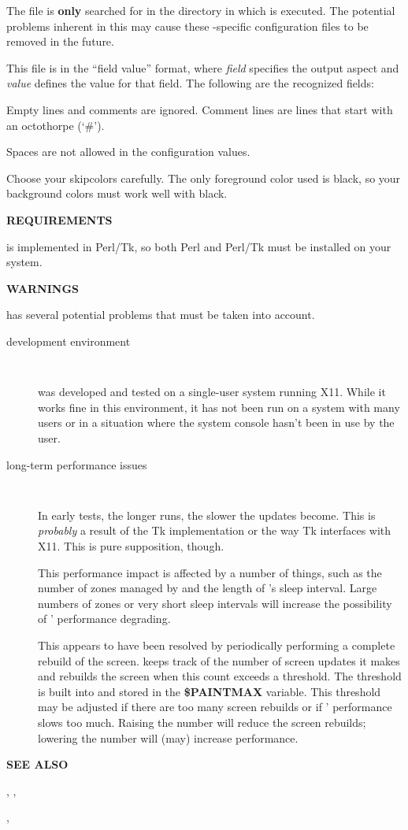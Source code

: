 The  file is {\bf only} searched for in the directory in
which  is executed.  The potential problems inherent in
this may cause these -specific configuration files to be
removed in the future.

This file is in the ``field value'' format, where {\it field} specifies the
output aspect and {\it value} defines the value for that field.  The following
are the recognized fields:

Empty lines and comments are ignored.  Comment lines are lines that start
with an octothorpe (`\#').

Spaces are not allowed in the configuration values.

Choose your skipcolors carefully.  The only foreground color used is black, so
your background colors must work well with black.

{\bf REQUIREMENTS}

 is implemented in Perl/Tk, so both Perl and Perl/Tk must be
installed on your system.

{\bf WARNINGS}

 has several potential problems that must be taken into
account.

\begin{description}

\item [development environment]\verb" "

 was developed and tested on a single-user system running
X11.  While it works fine in this environment, it has not been run on a system
with many users or in a situation where the system console hasn't been in use
by the  user.

\item [long-term performance issues]\verb" "

In early tests, the longer  runs, the slower the
updates become.  This is {\it probably} a result of the Tk implementation
or the way Tk interfaces with X11.  This is pure supposition, though.

This performance impact is affected by a number of things, such as the number
of zones managed by  and the length of 's sleep
interval.  Large numbers of zones or very short sleep intervals will increase
the possibility of ' performance degrading.

This appears to have been resolved by periodically performing a complete
rebuild of the screen.   keeps track of the number of
screen updates it makes and rebuilds the screen when this count exceeds a
threshold.  The threshold is built into  and stored in the
{\bf \$PAINTMAX} variable.  This threshold may be adjusted if there are too
many screen rebuilds or if ' performance slows too much.
Raising the number will reduce the screen rebuilds; lowering the number will
(may) increase performance.

\end{description}

{\bf SEE ALSO}

,
,


,
